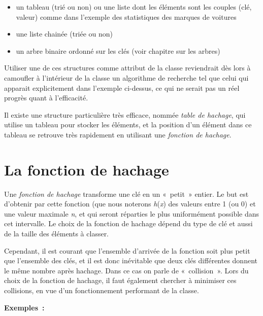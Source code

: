 	\begin{itemize}
		\item {
			un tableau (trié ou non) ou une liste dont les éléments sont 
			les couples (clé, valeur) comme dans l'exemple des
			statistiques des marques de voitures}
		\item {
			une liste chainée (triée ou non)}
		\item {
			un arbre binaire ordonné sur les clés (voir chapitre sur les arbres)}
	\end{itemize}
	
	Utiliser une de ces structures comme attribut de la classe 
	reviendrait dès lors à camoufler à l'intérieur de la classe
	un algorithme de recherche tel que celui qui apparait explicitement 
	dans l'exemple ci-dessus, ce qui ne serait pas un
	réel progrès quant à l'efficacité.

	Il existe une structure particulière très efficace, nommée 
	\textit{table de hachage}, qui utilise un tableau pour
	stocker les éléments, et la position d'un élément dans ce 
	tableau se retrouve très rapidement en utilisant une
	\textit{fonction de hachage}.


\section{La fonction de hachage}

	Une \textit{fonction de hachage} transforme une clé 
	en un «~petit~» entier. Le but est d'obtenir par cette
	fonction (que nous noterons \textit{h}(\textit{x}) des 
	valeurs entre 1 (ou 0) et une valeur maximale \textit{n}, 
	et qui seront réparties le plus uniformément possible dans 
	cet intervalle. Le choix de la fonction de hachage dépend du 
	type de clé et aussi de la taille des éléments à classer.

	Cependant, il est courant que l'ensemble d'arrivée de la 
	fonction soit plus petit que l'ensemble des clés, et il est
	donc inévitable que deux clés différentes donnent le même 
	nombre après hachage. Dans ce cas on parle de «~collision~».
	Lors du choix de la fonction de hachage, il faut également 
	chercher à minimiser ces collisions, en vue d'un
	fonctionnement performant de la classe.

	\textbf{Exemples~:}

